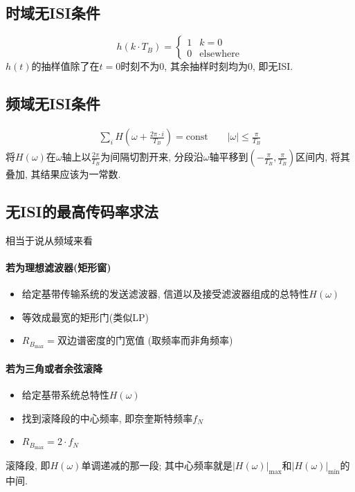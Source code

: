 \documentclass[a4paper]{report}
\begin{document}
\subsection{时域无ISI条件}
\begin{equation}
  h(k\cdot T_B)=\begin{cases}
    1 &k=0
    \\ 0 & \text{elsewhere}
  \end{cases}
\end{equation}
$h(t)$的抽样值除了在$t=0$时刻不为0, 其余抽样时刻均为0, 即无ISI. 
\subsection{频域无ISI条件}
\begin{align*}
  \displaystyle\sum_{i}H(\omega+\frac{2\pi\cdot i}{T_B})=\text{const} \qquad \lvert \omega \rvert \leq \frac{\pi}{T_B}
\end{align*}
将$H(\omega)$在$\omega$轴上以$\frac{2\pi}{T_B}$为间隔切割开来, 分段沿$\omega$轴平移到$(-\frac{\pi}{T_B},\frac{\pi}{T_B})$区间内, 将其叠加, 其结果应该为一常数. 

\subsection{无ISI的最高传码率求法}
相当于说从频域来看
\paragraph{若为理想滤波器(矩形窗)}
\begin{itemize}
  \item 给定基带传输系统的发送滤波器, 信道以及接受滤波器组成的总特性$H(\omega)$
  \item 等效成最宽的矩形门(类似LP)
  \item $R_{B_{\max}}=$双边谱密度的门宽值 (取频率而非角频率)
\end{itemize}
\paragraph{若为三角或者余弦滚降}
\begin{itemize}
  \item 给定基带系统总特性$H(\omega)$
  \item 找到滚降段的中心频率, 即奈奎斯特频率$f_N$
  \item $R_{B_{\max}}=2\cdot f_N$
\end{itemize}
滚降段, 即$H(\omega)$单调递减的那一段; 其中心频率就是$\lvert H(\omega)\rvert_{\max}$和$\lvert H(\omega)\rvert_{\min}$的中间. 
\end{document}
